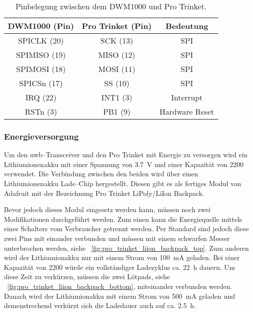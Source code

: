 \begin{table}
	\centering
	\begin{tabular}{||c|c|c||} 
		\hline
		DWM1000 (Pin)&Pro Trinket (Pin)&Bedeutung\\\hline
		\hline
		SPICLK (20)&SCK (13)&SPI\\\hline
		SPIMISO (19)&MISO (12)&SPI\\\hline
		SPIMOSI (18)&MOSI (11)&SPI\\\hline
		SPICSn (17)&SS (10)&SPI\\\hline
		\hline
		IRQ (22)&INT1 (3)&Interrupt\\\hline
		\hline
		RSTn (3)&PB1 (9)&Hardware Reset\\\hline
	\end{tabular}
	\caption{Pinbelegung zwischen dem DWM1000 und Pro Trinket.}
	\label{tab:pin_assignment_between_dwm1k_and_pro_trinket}
\end{table}


\begin{comment}
------------------------------------------------------------------------------------------
\end{comment}
\subsubsection{Energieversorgung}

Um den \gls{uwb}--Transceiver und den Pro Trinket mit Energie zu versorgen wird ein Lithiumionenakku mit einer Spannung von \SI{3.7}{\volt} und einer Kapazität von \SI{2200}{\mAh} verwendet. Die Verbindung zwischen den beiden wird über einen Lithiumionenakku Lade--Chip hergestellt. Diesen gibt es als fertiges Modul von Adafruit mit der Bezeichnung Pro Trinket LiPoly/LiIon Backpack.

Bevor jedoch dieses Modul eingesetz werden kann, müssen noch zwei Modifikationen durchgeführt werden. Zum einen kann die Energiequelle mittels eines Schalters vom Verbraucher getrennt werden. Per Standard sind jedoch diese zwei Pins mit einander verbunden und müssen mit einem schwarfen Messer unterbrochen werden, siehe \figurename~\ref{fig:pro_trinket_liion_backpack_top}. Zum anderen wird der Lithiumionakku nur mit einem Strom von \SI{100}{\mA} geladen. Bei einer Kapazität von \SI{2200}{\mAh} würde ein vollständiger Ladezyklus ca. \SI{22}{\hour} dauern. Um diese Zeit zu verkürzen, müssen die zwei Lötpads, siehe \figurename~\ref{fig:pro_trinket_liion_backpack_bottom}, miteinander verbunden werden. Danach wird der Lithiumionakku mit einem Strom von \SI{500}{\mA} geladen und demenstrechend verkürzt sich die Ladedauer auch auf ca. \SI{2.5}{\hour}.

